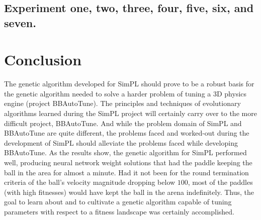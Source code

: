 \documentclass[a4paper,10pt]{article}
\begin{document}
\subsection{Experiment one, two, three, four, five, six, and seven.}

\section{Conclusion}

The genetic algorithm developed for SimPL should prove to be a robust basis for the genetic algorithm needed to solve a harder problem of tuning a 3D physics engine (project BBAutoTune). The principles and techniques of evolutionary algorithms learned during the SimPL project will certainly carry over to the more difficult project, BBAutoTune. And while the problem domain of SimPL and BBAutoTune are quite different, the problems faced and worked-out during the development of SimPL should alleviate the problems faced while developing BBAutoTune. As the results show, the genetic algorithm for SimPL performed well, producing neural network weight solutions that had the paddle keeping the ball in the area for almost a minute. Had it not been for the round termination criteria of the ball's velocity magnitude dropping below $100$, most of the paddles (with high fitnesses) would have kept the ball in the arena indefinitely. Thus, the goal to learn about and to cultivate a genetic algorithm capable of tuning parameters with respect to a fitness landscape was certainly accomplished.     



\end{document}
